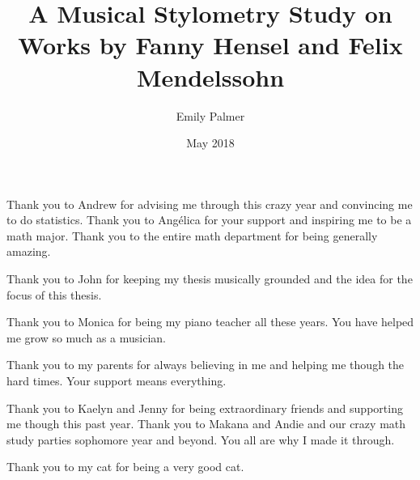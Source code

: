 \documentclass[12pt,twoside]{reedthesis}
\title{A Musical Stylometry Study on Works by Fanny Hensel and Felix
Mendelssohn}
\author{Emily Palmer}
\date{May 2018}
\theoremstyle{definition}
\theoremstyle{definition}
\theoremstyle{definition}
\theoremstyle{remark}
\begin{document}
  \maketitle

\frontmatter %
\pagestyle{empty} %
  \begin{acknowledgements}
    Thank you to Andrew for advising me through this crazy year and
    convincing me to do statistics. Thank you to Angélica for your support
    and inspiring me to be a math major. Thank you to the entire math
    department for being generally amazing.
    
    Thank you to John for keeping my thesis musically grounded and the idea
    for the focus of this thesis.
    
    Thank you to Monica for being my piano teacher all these years. You have
    helped me grow so much as a musician.
    
    Thank you to my parents for always believing in me and helping me though
    the hard times. Your support means everything.
    
    Thank you to Kaelyn and Jenny for being extraordinary friends and
    supporting me though this past year. Thank you to Makana and Andie and
    our crazy math study parties sophomore year and beyond. You all are why
    I made it through.
    
    Thank you to my cat for being a very good cat.
  \end{acknowledgements}

  \hypersetup{linkcolor=black}
  \setcounter{tocdepth}{2}
  \tableofcontents

  \listoftables
\end{document}
